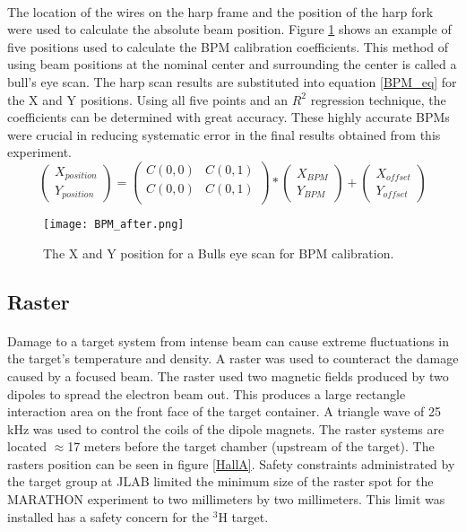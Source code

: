 		\paragraph{}The location of the wires on the harp frame and the position of the harp fork were used to calculate the absolute beam position. Figure \ref{bulls} shows an example of five positions used to calculate the BPM calibration coefficients. This method of using beam positions at the nominal center and surrounding the center is called a bull's eye scan. The harp scan results are substituted into equation \ref{BPM_eq} for the X and Y positions. Using all five points and an $R^2$ regression technique, the coefficients can be determined with great accuracy. These highly accurate BPMs were crucial in reducing systematic error in the final results obtained from this experiment. 
		\begin{equation}
		\label{BPM_eq}
		\begin{pmatrix}
		X_{position}\\
		Y_{position}
		\end{pmatrix}
		=
		\begin{pmatrix}
		C(0,0) & C(0,1)\\
		C(0,0) & C(0,1)\\
		\end{pmatrix}
		*
		\begin{pmatrix}
		X_{BPM}\\
		Y_{BPM}
		\end{pmatrix}
		+
		\begin{pmatrix}
		X_{offset}\\
		Y_{offset}
		\end{pmatrix}			 
		\end{equation}
		
		\begin{figure}[t]
			\centering
			\caption{The X and Y position for a Bulls eye scan for BPM calibration. }
			\label{bulls}
			\texttt{[image: BPM\_after.png]} 
		\end{figure} 	

	 \subsection{Raster}
	 \paragraph{} Damage to a target system from intense beam can cause extreme fluctuations in the target's temperature and density. A raster was used to counteract the damage caused by a focused beam. The raster used two magnetic fields produced by two dipoles to spread the electron beam out. This produces a large rectangle interaction area on the front face of the target container. A triangle wave of 25 kHz was used to control the coils of the dipole magnets. The raster systems are located $\approx$17 meters before the target chamber (upstream of the target\cite{BPM2}). The rasters position can be seen in figure \ref{HallA}. Safety constraints administrated by the target group at JLAB limited the minimum size of the raster spot for the MARATHON experiment to two millimeters by two millimeters. This limit was installed has a safety concern for the $^3$H target. 
